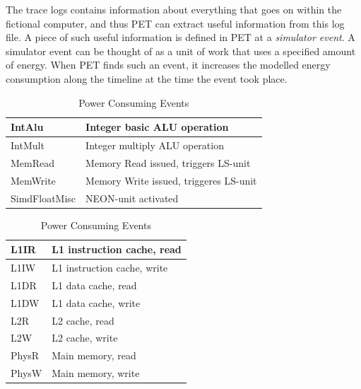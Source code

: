 The trace logs contains information about everything that goes on within the
fictional computer, and thus PET can extract useful information from this log
file. A piece of such useful information is defined in PET at a \emph{simulator
event}. A simulator event can be thought of as a unit of work that uses a
specified amount of energy. When PET finds such an event, it increases the
modelled energy consumption along the timeline at the time the event took place.

\begin{table}[ht]
    \centering
    \begin{minipage}[b]{\linewidth}
        \centering
        \begin{tabular}{|l|l|}
            \hline
            IntAlu    & Integer basic ALU operation\\
            \hline
            IntMult    & Integer multiply ALU operation \\
            \hline
            MemRead    & Memory Read issued, triggers LS-unit \\
            \hline
            MemWrite    & Memory Write issued, triggeres LS-unit \\
            \hline
            SimdFloatMisc     & NEON-unit activated \\
            \hline
        \end{tabular}
    \end{minipage}

    \begin{minipage}[b]{\linewidth}
        \centering
        \begin{tabular}{|l|l|}
            \hline
            L1IR    & L1 instruction cache, read \\
            \hline
            L1IW    & L1 instruction cache, write \\
            \hline
            L1DR    & L1 data cache, read \\
            \hline
            L1DW    & L1 data cache, write \\
            \hline
            L2R     & L2 cache, read \\
            \hline
            L2W     & L2 cache, write \\
            \hline
            PhysR   & Main memory, read \\
            \hline
            PhysW   & Main memory, write \\
            \hline
        \end{tabular}
    \end{minipage}
    \caption{Power Consuming Events}
    \label{tbl:events}
\end{table}

